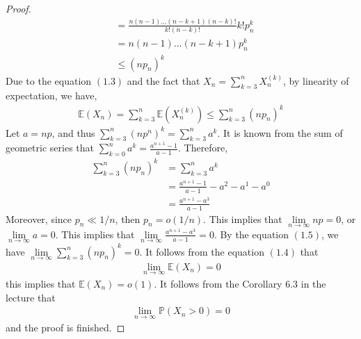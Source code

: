 \begin{proof}
\begin{align*}
                            &= \frac{n(n-1) \ldots (n-k+1)(n-k)!}{k! (n-k)!} k! p_{n}^{k} \\
                            &= n(n-1) \ldots (n-k+1) p_{n}^{k} \\
                            &\leq (n p_{n})^{k} \tag{1.3}
  \end{align*}
  Due to the equation $(1.3)$ and the fact that $X_{n} = \sum\limits_{k=3}^{n} X_{n}^{(k)}$, by linearity of expectation, we have,
  \begin{align*}
    \mathbb{E}(X_{n}) = \sum_{k=3}^{n} \mathbb{E}(X_{n}^{(k)}) \leq \sum_{k=3}^{n} (n p_{n})^{k} \tag{1.4}
  \end{align*}
  Let $a = np$, and thus $\sum\limits_{k=3}^{n} (np^{n})^{k} = \sum\limits_{k=3}^{n} a^{k}$. It is known from the sum of geometric series that $\sum\limits_{k=0}^{n} a^{k} = \frac{a^{n+1}-1}{a-1}$. Therefore,
  \begin{align*}
    \sum_{k=3}^{n} (n p_{n})^{k} &= \sum_{k=3}^{n} a^{k} \\
                                 &= \frac{a^{n+1}-1}{a-1} - a^{2} - a^{1} - a^{0} \\
                                 &= \frac{a^{n+1} - a^{3}}{a-1} \tag{1.5}
  \end{align*}
  Moreover, since $p_{n} \ll 1/n$, then $p_{n} = o(1/n)$. This implies that $\lim\limits_{n \to \infty} np = 0$, or $\lim\limits_{n \to \infty} a = 0$. This implies that $\lim\limits_{n \to \infty} \frac{a^{n+1} - a^{3}}{a-1} = 0$. By the equation $(1.5)$, we have $\lim\limits_{n \to \infty} \sum\limits_{k=3}^{n} (n p_{n})^{k} = 0$. It follows from the equation $(1.4)$ that 
  \begin{align*}
    \lim\limits_{n \to \infty} \mathbb{E}(X_{n}) = 0
  \end{align*}
  this implies that $\mathbb{E}(X_{n}) = o(1)$. It follows from the Corollary $6.3$ in the lecture that
  \begin{align*}
    \lim\limits_{n \to \infty} \mathbb{P}(X_{n} > 0) = 0
  \end{align*}
  and the proof is finished.
\end{proof}

